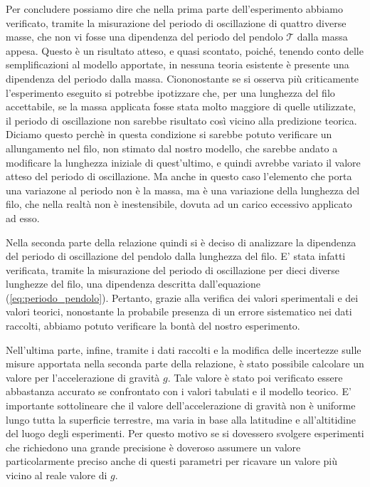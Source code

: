 Per concludere possiamo dire che nella prima parte dell'esperimento abbiamo verificato, tramite la misurazione del periodo di oscillazione di quattro diverse masse, che non vi fosse una dipendenza del periodo del pendolo $\mathcal{T}$ dalla massa appesa. Questo è un risultato atteso, e quasi scontato, poiché, tenendo conto delle semplificazioni al modello apportate, in nessuna teoria esistente è presente una dipendenza del periodo dalla massa. Ciononostante se si osserva più criticamente l'esperimento eseguito si potrebbe ipotizzare che, per una lunghezza del filo accettabile, se la massa applicata fosse stata molto maggiore di quelle utilizzate, il periodo di oscillazione non sarebbe risultato così vicino alla predizione teorica. Diciamo questo perchè in questa condizione si sarebbe potuto verificare un allungamento nel filo, non stimato dal nostro modello, che sarebbe andato a modificare la lunghezza iniziale di quest'ultimo, e quindi avrebbe variato il valore atteso del periodo di oscillazione. Ma anche in questo caso l'elemento che porta una variazone al periodo non è la massa, ma è una variazione della lunghezza del filo, che nella realtà non è inestensibile, dovuta ad un carico eccessivo applicato ad esso.

Nella seconda parte della relazione quindi si è deciso di analizzare la dipendenza del periodo di oscillazione del pendolo dalla lunghezza del filo. E' stata infatti verificata, tramite la misurazione del periodo di oscillazione per dieci diverse lunghezze del filo, una dipendenza descritta dall'equazione (\ref{eq:periodo_pendolo}). Pertanto, grazie alla verifica dei valori sperimentali e dei valori teorici, nonostante la probabile presenza di un errore sistematico nei dati raccolti, abbiamo potuto verificare la bontà del nostro esperimento.

Nell'ultima parte, infine, tramite i dati raccolti e la modifica delle incertezze sulle misure apportata nella seconda parte della relazione, è stato possibile calcolare un valore per l'accelerazione di gravità $g$. Tale valore è stato poi verificato essere abbastanza accurato se confrontato con i valori tabulati e il modello teorico. E' importante sottolineare che il valore dell'accelerazione di gravità non è uniforme lungo tutta la superficie terrestre, ma varia in base alla latitudine e all'altitidine del luogo degli esperimenti. Per questo motivo se si dovessero svolgere esperimenti che richiedono una grande precisione è doveroso assumere un valore particolarmente preciso anche di questi parametri per ricavare un valore più vicino al reale valore di $g$.

